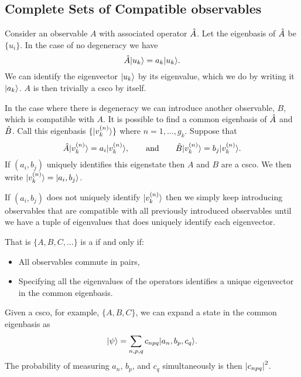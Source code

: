     \subsection{Complete Sets of Compatible observables}
    Consider an observable \(A\) with associated operator \(\hat{A}\).
    Let the eigenbasis of \(\hat{A}\) be \(\{u_i\}\).
    In the case of no degeneracy we have
    \[\hat{A}\vert {u_k} \rangle = a_k\vert {u_k} \rangle.\]
    We can identify the eigenvector \(\vert {u_k} \rangle\) by its eigenvalue, which we do by writing it \(\vert {a_k} \rangle\).
    \(A\) is then trivially a \gls{csco} by itself.
    
    In the case where there is degeneracy we can introduce another observable, \(B\), which is compatible with \(A\).
    It is possible to find a common eigenbasis of \(\hat{A}\) and \(\hat{B}\).
    Call this eigenbasis \(\{\vert {v_k^{(n)}} \rangle\}\) where \(n=1,\dotsc, g_k\).
    Suppose that
    \[\hat{A}\vert {v_k^{(n)}} \rangle = a_i\vert {v_k^{(n)}} \rangle, \qquad\text{and}\qquad \hat{B}\vert {v_k^{(n)}} \rangle = b_j\vert {v_k^{(n)}} \rangle.\]
    If \((a_i, b_j)\) uniquely identifies this eigenstate then \(A\) and \(B\) are a \gls{csco}.
    We then write \(\vert {v_{k}^{(n)}} \rangle = \vert {a_i, b_j} \rangle\).
    
    If \((a_i, b_j)\) does not uniquely identify \(\vert {v_k^{(n)}} \rangle\) then we simply keep introducing observables that are compatible with all previously introduced observables until we have a tuple of eigenvalues that does uniquely identify each eigenvector.
    
    That is \(\{A, B, C, \dotsc\}\) is a  if and only if:
    \begin{itemize}
        \item All observables commute in pairs,
        \item Specifying all the eigenvalues of the operators identifies a unique eigenvector in the common eigenbasis.
    \end{itemize}

    Given a \gls{csco}, for example, \(\{A, B, C\}\), we can expand a state in the common eigenbasis as
    \[\vert {\psi} \rangle = \sum_{n, p, q}c_{npq}\vert {a_n,b_p,c_q} \rangle.\]
    The probability of measuring \(a_n\), \(b_p\), and \(c_q\) simultaneously is then \(\abs{c_{npq}}^2\).
    
